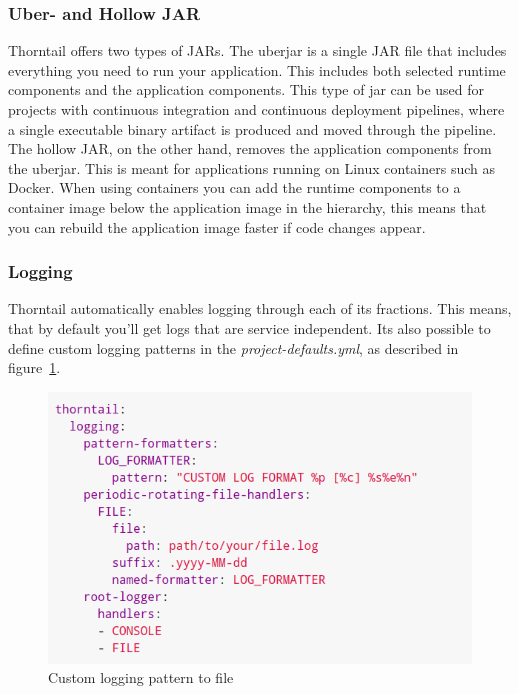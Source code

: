 \subsubsection{Uber- and Hollow JAR}
Thorntail offers two types of JARs. The uberjar is a single JAR file that includes everything you need to run your application. This includes both selected runtime components and the application components. This type of jar can be used for projects with continuous integration and continuous deployment pipelines, where a single executable binary artifact is produced and moved through the pipeline. The hollow JAR, on the other hand, removes the application components from the uberjar. This is meant for applications running on Linux containers such as Docker. When using containers you can add the runtime components to a container image below the application image in the hierarchy, this means that you can rebuild the application image faster if code changes appear.\cite{ThorntailDoc} 

\subsubsection{Logging}
Thorntail automatically enables logging through each of its fractions. This means, that by default you'll get logs that are service independent. Its also possible to define custom logging patterns in the \textit{project-defaults.yml}, as described in figure~\ref{fig:logging}. \cite{Thorntaillogging}\\

\begin{figure}[ht]
  \centering
  \includegraphics[scale=0.8]{figs/loggingconfig.png}
  \caption{Custom logging pattern to file}
  \label{fig:logging}
\end{figure}


